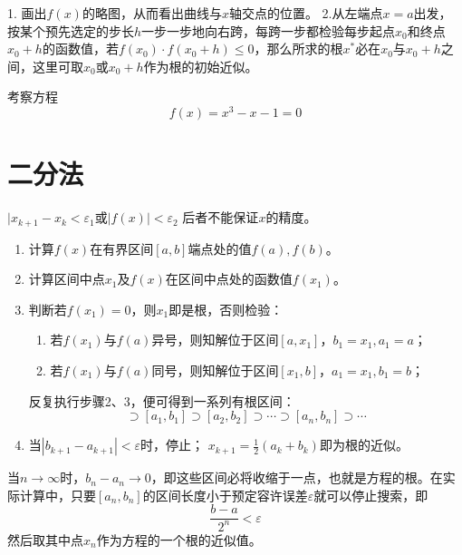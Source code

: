 \begin{definition}[定步长搜索法]
    1. 画出$f(x)$的略图，从而看出曲线与$x$轴交点的位置。
    2.从左端点$x=a$出发，按某个预先选定的步长$h$一步一步地向右跨，每跨一步都检验每步起点$x_0$和终点$x_0+h$的函数值，若$f(x_0) \cdot f(x_0+h) \leq 0$，那么所求的根$x^*$必在$x_0$与$x_0+h$之间，这里可取$x_0$或$x_0+h$作为根的初始近似。
\end{definition}

\begin{example}
    考察方程
    \begin{equation*}
        f(x) = x^3-x-1 = 0
    \end{equation*}
\end{example}

\section{二分法}
$|x_{k+1}-x_k < \varepsilon_1$或$|f(x)| < \varepsilon_2 $
后者不能保证$x$的精度。

\begin{enumerate}
    \item 计算$f(x)$在有界区间$[a,b]$端点处的值$f(a),f(b)$。
    \item 计算区间中点$x_1$及$f(x)$在区间中点处的函数值$f(x_1)$。
    \item 判断若$f(x_1) = 0$，则$x_1$即是根，否则检验：
    \begin{enumerate}
        \item 若$f(x_1)$与$f(a)$异号，则知解位于区间$[a,x_1]$，$b_1 = x_1,a_1 = a$；
        \item 若$f(x_1)$与$f(a)$同号，则知解位于区间$[x_1,b]$，$a_1 = x_1,b_1 = b$；
    \end{enumerate}
        反复执行步骤2、3，便可得到一系列有根区间：
        \begin{equation*}
            [a,b]\supset [a_1,b_1] \supset [a_2,b_2] \supset \cdots \supset [a_n,b_n] \supset \cdots
        \end{equation*}
    \item 当$|b_{k+1}-a_{k+1}| < \varepsilon$时，停止；
        $x_{k+1} = \frac{1}{2}(a_k+b_k)$即为根的近似。
\end{enumerate}

\begin{remark}
    当$n \rightarrow \infty $时，$b_n-a_n \rightarrow 0$，即这些区间必将收缩于一点，也就是方程的根。在实际计算中，只要$[a_n,b_n]$的区间长度小于预定容许误差$\varepsilon$就可以停止搜索，即
    \begin{equation*}
        \frac{b-a}{2^n} < \varepsilon
    \end{equation*}
    然后取其中点$x_n$作为方程的一个根的近似值。
\end{remark}

